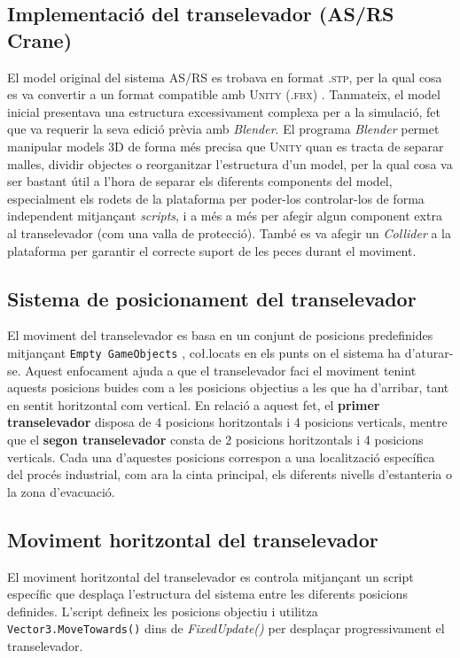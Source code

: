 \documentclass[a4paper,11pt,DIV=13,headings=normal,abstract=true,twoside=semi]{article}
\newcommand{\acro}[1]{\textsc{#1}}
\begin{document}
\subsection{Implementació del transelevador (AS/RS Crane)}

El model original del sistema \acro{AS/RS} es trobava en format \acro{.stp}, per la qual cosa es va convertir a un format compatible amb \acro{Unity} (\acro{.fbx}) \cite{stp_to_fbx}. Tanmateix, el model inicial presentava una estructura excessivament complexa per a la simulació, fet que va requerir la seva edició prèvia amb \emph{Blender}. El programa \emph{Blender} permet manipular models 3D de forma més precisa que \acro{Unity} quan es tracta de separar malles, dividir objectes o reorganitzar l'estructura d'un model, per la qual cosa va ser bastant útil a l'hora de separar els diferents components del model, especialment els rodets de la plataforma per poder-los controlar-los de forma independent mitjançant \emph{scripts}, i a més a més per afegir algun component extra al transelevador (com una valla de protecció). També es va afegir un \emph{Collider} a la plataforma per garantir el correcte suport de les peces durant el moviment.

\subsection*{Sistema de posicionament del transelevador}

El moviment del transelevador es basa en un conjunt de posicions predefinides mitjançant \texttt{Empty GameObjects} \cite{UnityGameObjects}, co\l.locats en els punts on el sistema ha d'aturar-se. Aquest enfocament ajuda a que el transelevador faci el moviment tenint aquests posicions buides com a les posicions objectius a les que ha d'arribar, tant en sentit horitzontal com vertical. En relació a aquest fet, el \textbf{primer transelevador} disposa de 4 posicions horitzontals i 4 posicions verticals, mentre que el \textbf{segon transelevador} consta de 2 posicions horitzontals i 4 posicions verticals.
Cada una d'aquestes posicions correspon a una localització específica del procés industrial, com ara la cinta principal, els diferents nivells d'estanteria o la zona d'evacuació.

\subsection*{Moviment horitzontal del transelevador}

El moviment horitzontal del transelevador es controla mitjançant un script específic que desplaça l'estructura del sistema entre les diferents posicions definides. L'script defineix les posicions objectiu i utilitza \texttt{Vector3.MoveTowards()} dins de \emph{FixedUpdate()} \cite{UnityUpdate} per desplaçar progressivament el transelevador. 
\end{document}
